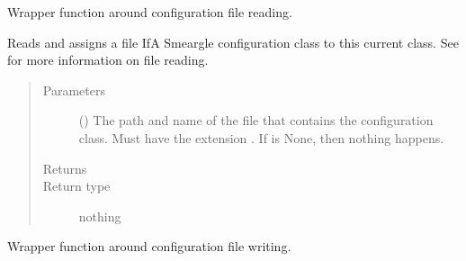 \documentclass[letterpaper,10pt,english]{sphinxmanual}
\begin{document}
\begin{fulllineitems}
\begin{fulllineitems}
\begin{quote}
\begin{description}
\end{description}\end{quote}

\end{fulllineitems}


\begin{fulllineitems}
\label{\detokenize{python_docstrings/IfA_Smeargle.yankee.configuration_classes.BaseConfig_file:IfA_Smeargle.yankee.configuration_classes.BaseConfig_file.BaseConfig.read_from_file}}
Wrapper function around configuration file reading.

Reads and assigns a file IfA Smeargle configuration class to this
current class. See  for more information on
file reading.
\begin{quote}\begin{description}
\item[{Parameters}] \leavevmode
{} () \textendash{} The path and name of the file that contains the configuration
class. Must have the extension . If 
is None, then nothing happens.

\item[{Returns}] \leavevmode


\item[{Return type}] \leavevmode
nothing

\end{description}\end{quote}

\end{fulllineitems}


\begin{fulllineitems}
\label{\detokenize{python_docstrings/IfA_Smeargle.yankee.configuration_classes.BaseConfig_file:IfA_Smeargle.yankee.configuration_classes.BaseConfig_file.BaseConfig.write_to_file}}
Wrapper function around configuration file writing.


\end{fulllineitems}
\end{fulllineitems}
\end{document}
